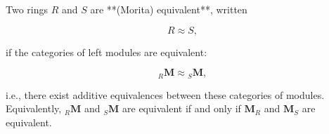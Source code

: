 Two rings $R$ and $S$ are **(Morita) equivalent**, written

$$R \approx S,$$

if the categories of left modules are equivalent:

$${}_R \mathbf{M} \approx {}_S \mathbf{M},$$

i.e., there exist additive equivalences between these categories of modules. Equivalently, ${}_R \mathbf{M}$ and ${}_S \mathbf{M}$ are equivalent if and only if $\mathbf{M}_R$ and $\mathbf{M}_S$ are equivalent.
